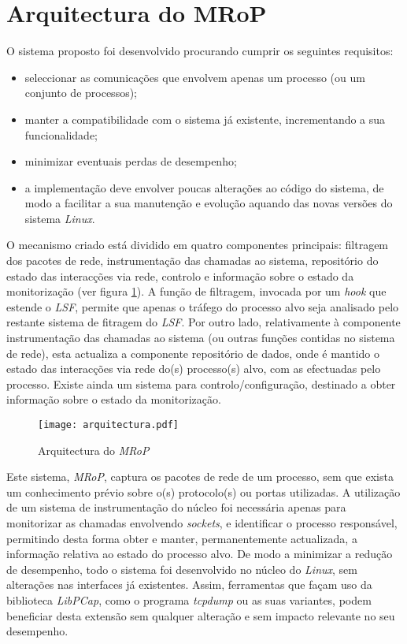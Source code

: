 \section{Arquitectura do MRoP}
\label{sec:mrop_architecture}

O sistema proposto foi desenvolvido procurando cumprir os seguintes requisitos:
\begin{itemize}
\item seleccionar as comunicações que envolvem apenas um processo (ou um conjunto de processos);
\item manter a compatibilidade com o sistema já existente, incrementando a sua funcionalidade;
\item minimizar eventuais perdas de desempenho;
\item a implementação deve envolver poucas alterações ao código do sistema, de modo a facilitar a sua manutenção e evolução aquando das novas versões do sistema \textit{Linux}.
\end{itemize}

O mecanismo criado está dividido em quatro componentes principais: filtragem dos pacotes de rede, instrumentação das chamadas ao sistema, repositório do estado das interacções via rede, controlo e informação sobre o estado da monitorização (ver figura \ref{fig:arquitectura}).
A função de filtragem, invocada por um \textit{hook} que estende o \textit{LSF}, permite que apenas o tráfego do processo alvo seja analisado pelo restante sistema de fitragem do \textit{LSF}.
Por outro lado, relativamente à componente instrumentação das chamadas ao sistema (ou outras funções contidas no sistema de rede), esta actualiza a componente repositório de dados, onde é mantido o estado das interacções via rede do(s) processo(s) alvo, com as efectuadas pelo processo.
Existe ainda um sistema para controlo/configuração, destinado a obter informação sobre o estado da monitorização.

\begin{figure}[htbp]
\begin{center}
\texttt{[image: arquitectura.pdf]} 
\caption{Arquitectura do \textit{MRoP}}
\label{fig:arquitectura}
\end{center}
\end{figure}

Este sistema, \textit{MRoP}, captura os pacotes de rede de um processo, sem que exista um conhecimento prévio sobre o(s) protocolo(s) ou portas utilizadas.
A utilização de um sistema de instrumentação do núcleo foi necessária apenas para monitorizar as chamadas envolvendo \emph{sockets}, e identificar o processo responsável, permitindo desta forma obter e manter, permanentemente actualizada, a informação relativa ao estado do processo alvo.
De modo a minimizar a redução de desempenho, todo o sistema foi desenvolvido no núcleo do \textit{Linux}, sem alterações nas interfaces já existentes.
Assim, ferramentas que façam uso da biblioteca \textit{LibPCap}, como o programa \textit{tcpdump} ou as suas variantes, podem beneficiar desta extensão sem qualquer alteração e sem impacto relevante no seu desempenho.


